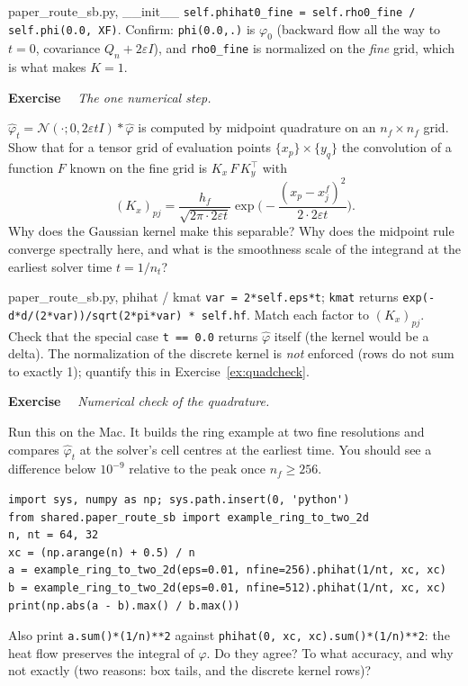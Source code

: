 \documentclass[11pt]{article}
\newcommand{\eps}{\varepsilon}
\newcommand{\code}[1]{\texttt{#1}}
\newcommand{\Nc}{\mathcal{N}}
\newcommand{\hphi}{\hat\varphi}
\newcounter{ex}
\newenvironment{ex}[1]{\refstepcounter{ex}\par\medskip\noindent\textbf{Exercise \theex}\ \ \textit{#1}\par\nopagebreak\smallskip}{\par\medskip}
\begin{document}
\begin{codebox}{paper\_route\_sb.py, \_\_init\_\_}
\code{self.phihat0\_fine = self.rho0\_fine / self.phi(0.0, XF)}. Confirm: \code{phi(0.0,.)}
is $\varphi_0$ (backward flow all the way to $t=0$, covariance $Q_n+2\eps I$), and
\code{rho0\_fine} is normalized on the \emph{fine} grid, which is what makes $K=1$.
\end{codebox}

\begin{ex}{The one numerical step.}
$\hphi_t=\Nc(\cdot;0,2\eps tI)*\hphi$ is computed by midpoint quadrature on an
$n_f\times n_f$ grid. Show that for a tensor grid of evaluation points
$\{x_p\}\times\{y_q\}$ the convolution of a function $F$ known on the fine grid is
$K_x\,F\,K_y^{\!\top}$ with
\[
  (K_x)_{pj}=\frac{h_f}{\sqrt{2\pi\cdot2\eps t}}\exp\!\Big(-\frac{(x_p-x^f_j)^2}{2\cdot2\eps t}\Big).
\]
Why does the Gaussian kernel make this separable? Why does the midpoint rule converge
spectrally here, and what is the smoothness scale of the integrand at the earliest solver
time $t=1/n_t$?
\end{ex}

\begin{codebox}{paper\_route\_sb.py, phihat / kmat}
\code{var = 2*self.eps*t}; \code{kmat} returns
\code{exp(-d*d/(2*var))/sqrt(2*pi*var) * self.hf}. Match each factor to $(K_x)_{pj}$.
Check that the special case \code{t == 0.0} returns $\hphi$ itself (the kernel would be a
delta). The normalization of the discrete kernel is \emph{not} enforced (rows do not sum to
exactly 1); quantify this in Exercise~\ref{ex:quadcheck}.
\end{codebox}

\begin{ex}{Numerical check of the quadrature.}
\label{ex:quadcheck}
Run this on the Mac. It builds the ring example at two fine resolutions and compares
$\hphi_t$ at the solver's cell centres at the earliest time. You should see a difference
below $10^{-9}$ relative to the peak once $n_f\ge256$.
\begin{lstlisting}
import sys, numpy as np; sys.path.insert(0, 'python')
from shared.paper_route_sb import example_ring_to_two_2d
n, nt = 64, 32
xc = (np.arange(n) + 0.5) / n
a = example_ring_to_two_2d(eps=0.01, nfine=256).phihat(1/nt, xc, xc)
b = example_ring_to_two_2d(eps=0.01, nfine=512).phihat(1/nt, xc, xc)
print(np.abs(a - b).max() / b.max())
\end{lstlisting}
Also print \code{a.sum()*(1/n)**2} against \code{phihat(0, xc, xc).sum()*(1/n)**2}: the heat
flow preserves the integral of $\hphi$. Do they agree? To what accuracy, and why not exactly
(two reasons: box tails, and the discrete kernel rows)?
\end{ex}
\end{document}
